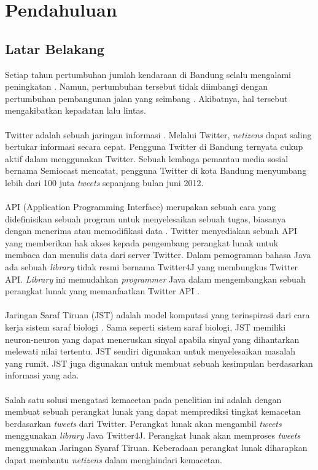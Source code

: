 \chapter{Pendahuluan}
\section{Latar Belakang}
Setiap tahun pertumbuhan jumlah kendaraan di Bandung selalu mengalami peningkatan \cite{KendaraanMotorBandung:2014}. Namun, pertumbuhan tersebut tidak diimbangi dengan pertumbuhan pembangunan jalan yang seimbang \cite{PanjangJalanBandung:2014}. Akibatnya, hal tersebut mengakibatkan kepadatan lalu lintas.\\\\
Twitter adalah sebuah jaringan informasi \cite{TwitterDef:2015}. Melalui Twitter, \textit{netizens} dapat saling bertukar informasi secara cepat. Pengguna Twitter di Bandung ternyata cukup aktif dalam menggunakan Twitter.  Sebuah lembaga pemantau media sosial bernama Semiocast mencatat, pengguna Twitter di kota Bandung menyumbang lebih dari 100 juta \textit{tweets} sepanjang bulan juni 2012.\\\\
API (Application Programming Interface) merupakan sebuah cara yang didefinisikan sebuah program untuk menyelesaikan sebuah tugas, biasanya dengan menerima atau memodifikasi data \cite{TwitterApi:2015}. Twitter menyediakan sebuah API yang memberikan hak akses kepada pengembang perangkat lunak untuk membaca dan menulis data dari server Twitter. Dalam pemograman bahasa Java ada sebuah \textit{library} tidak resmi bernama Twitter4J yang membungkus Twitter API. \textit{Library} ini memudahkan \textit{programmer} Java dalam mengembangkan sebuah perangkat lunak yang memanfaatkan Twitter API \cite{Twitter4j:2015}.\\\\
Jaringan Saraf Tiruan (JST) adalah model komputasi yang terinspirasi dari cara kerja sistem saraf biologi \cite{WhatisNN:2015}. Sama seperti sistem saraf biologi, JST memiliki neuron-neuron yang dapat meneruskan sinyal apabila sinyal yang dihantarkan melewati nilai tertentu. JST sendiri digunakan untuk menyelesaikan masalah yang rumit. JST juga digunakan untuk membuat sebuah kesimpulan berdasarkan informasi yang ada.\\\\
Salah satu solusi mengatasi kemacetan pada penelitian ini adalah dengan membuat sebuah perangkat lunak yang dapat memprediksi tingkat kemacetan berdasarkan \textit{tweets} dari Twitter. Perangkat lunak akan mengambil \textit{tweets} menggunakan \textit{library} Java Twitter4J. Perangkat lunak akan memproses \textit{tweets} menggunakan Jaringan Syaraf Tiruan. Keberadaan perangkat lunak diharapkan dapat membantu \textit{netizens} dalam menghindari kemacetan.

